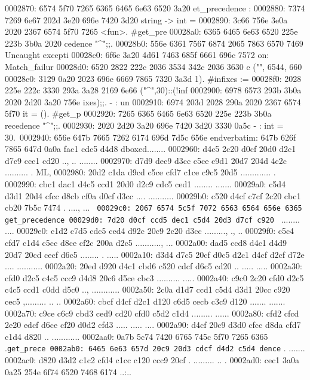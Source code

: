 \begin{bo
00010e0: 7865 647d 5c62 6567 696e 7b76 6572 6261  xed}
\begin{verba
00010f0: 7469 6d7d 0a20 2023 7479 7065 2074 6572  tim}
\begin{
0001c40: 7665 7262 6174 696d 7d0a 2020 236c 6574  verbatim}
\begin{boxe
00027a0: 647d 5c62 6567 696e 7b76 6572 6261 7469  d}
\begin{verbati
00027b0: 6d7d 0a20 2023 6c65 7420 696e 6669 7865  m}
0002870: 6574 5f70 7265 6365 6465 6e63 6520 3a20  et_precedence : 
0002880: 7374 7269 6e67 202d 3e20 696e 7420 3d20  string -> int = 
0002890: 3c66 756e 3e0a 2020 2367 6574 5f70 7265  <fun>.  #get_pre
00028a0: 6365 6465 6e63 6520 225e 223b 3b0a 2020  cedence "^";;.  
00028b0: 556e 6361 7567 6874 2065 7863 6570 7469  Uncaught excepti
00028c0: 6f6e 3a20 4d61 7463 685f 6661 696c 7572  on: Match_failur
00028d0: 6520 2822 222c 2036 3534 342c 2036 3630  e ("", 6544, 660
00028e0: 3129 0a20 2023 696e 6669 7865 7320 3a3d  1).  #infixes :=
00028f0: 2028 225e 222c 3330 293a 3a28 2169 6e66   ("^",30)::(!inf
0002900: 6978 6573 293b 3b0a 2020 2d20 3a20 756e  ixes);;.  - : un
0002910: 6974 203d 2028 290a 2020 2367 6574 5f70  it = ().  #get_p
0002920: 7265 6365 6465 6e63 6520 225e 223b 3b0a  recedence "^";;.
0002930: 2020 2d20 3a20 696e 7420 3d20 3330 0a5c    - : int = 30.\
0002940: 656e 647b 7665 7262 6174 696d 7d5c 656e  end{verbatim}\en
0002950: 647b 626f 7865 647d 0a0a fac1 cdc5 d4d8  d{boxed}........
0002960: d4c5 2c20 d0cf 20d0 d2c1 d7c9 ccc1 cd20  .., .. ........ 
0002970: d7d9 dec9 d3cc c5ce c9d1 20d7 204d 4c2c  .......... . ML,
0002980: 20d2 c1da d9cd c5ce cfd7 c1ce c9c5 20d5   ............. .
0002990: cbc1 dac1 d4c5 ccd1 20d0 d2c9 cdc5 ced1  ........ .......
00029a0: c5d4 d3d1 20d4 cfcc d8cb cf0a d0cf d3cc  .... ...........
00029b0: c520 d4cf c7cf 2c20 cbc1 cb20 7b5c 7474  . ...., ... {\tt
00029c0: 2067 6574 5c5f 7072 6563 6564 656e 6365   get\_precedence
00029d0: 7d20 d0cf ccd5 dec1 c5d4 20d3 d7cf c920  } ........ .... 
00029e0: c1d2 c7d5 cdc5 ced4 d92c 20c9 2c20 d3cc  ........., ., ..
00029f0: c5c4 cfd7 c1d4 c5cc d8ce cf2c 200a d2c5  ..........., ...
0002a00: dad5 ccd8 d4c1 d4d9 20d7 20cd cecf d6c5  ........ . .....
0002a10: d3d4 d7c5 20cf d0c5 d2c1 d4cf d2cf d72e  .... ...........
0002a20: 20ed d920 d4c1 cbd6 c520 cdcf d6c5 cd20   .. ..... ..... 
0002a30: cfd0 d2c5 c4c5 ccc9 d4d8 20c6 d5ce cbc3  .......... .....
0002a40: c9c0 2c20 cfd0 d2c5 c4c5 ccd1 c0dd d5c0  .., ............
0002a50: 2c0a d1d7 ccd1 c5d4 d3d1 20cc c920 cec5  ,......... .. ..
0002a60: cbcf d4cf d2c1 d120 c6d5 cecb c3c9 d120  ....... ....... 
0002a70: c9ce c6c9 cbd3 ced9 cd20 cfd0 c5d2 c1d4  ......... ......
0002a80: cfd2 cfcd 2e20 edcf d6ce cf20 d0d2 cfd3  ..... ..... ....
0002a90: d4cf 20c9 d3d0 cfcc d8da cfd7 c1d4 d820  .. ............ 
0002aa0: 0a7b 5c74 7420 6765 745c 5f70 7265 6365  .{\tt get\_prece
0002ab0: 6465 6e63 657d 20c9 20d3 cdcf d4d2 c5d4  dence} . .......
0002ac0: d820 d3d2 c1c2 cfd4 c1cc c120 ccc9 20cf  . ......... .. .
0002ad0: cec1 3a0a 0a25 254e 6f74 6520 7468 6174  ..:..%

\end{verbati
00027b0: 6d7d 0a20 2023 6c65 7420 696e 6669 7865  m}
\end{boxe
00027a0: 647d 5c62 6567 696e 7b76 6572 6261 7469  d}
\end{
0001c40: 7665 7262 6174 696d 7d0a 2020 236c 6574  verbatim}
\end{verba
00010f0: 7469 6d7d 0a20 2023 7479 7065 2074 6572  tim}
\end{bo
00010e0: 7865 647d 5c62 6567 696e 7b76 6572 6261  xed}
